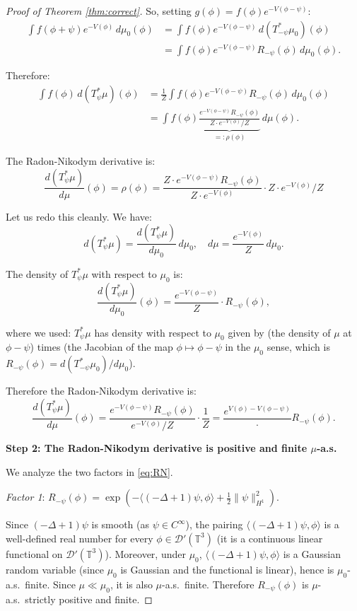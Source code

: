 \documentclass[12pt]{article}
\theoremstyle{definition}
\begin{document}
\begin{proof}[Proof of Theorem \ref{thm:correct}]
So, setting $g(\phi) = f(\phi)e^{-V(\phi-\psi)}$:
\begin{align*}
\int f(\phi+\psi) e^{-V(\phi)}\, d\mu_0(\phi) &= \int f(\phi) e^{-V(\phi-\psi)}\, d(T_{-\psi}^*\mu_0)(\phi) \\
&= \int f(\phi) e^{-V(\phi-\psi)} R_{-\psi}(\phi)\, d\mu_0(\phi).
\end{align*}

Therefore:
\begin{align*}
\int f(\phi)\, d(T_\psi^*\mu)(\phi) &= \frac{1}{Z} \int f(\phi) e^{-V(\phi-\psi)} R_{-\psi}(\phi)\, d\mu_0(\phi) \\
&= \int f(\phi) \underbrace{\frac{e^{-V(\phi-\psi)} R_{-\psi}(\phi)}{Z \cdot e^{-V(\phi)} / Z}}_{=: \rho(\phi)} \, d\mu(\phi).
\end{align*}

The Radon-Nikodym derivative is:
$$\frac{d(T_\psi^*\mu)}{d\mu}(\phi) = \rho(\phi) = \frac{Z \cdot e^{-V(\phi-\psi)} R_{-\psi}(\phi)}{Z \cdot e^{-V(\phi)}} \cdot Z \cdot e^{-V(\phi)} / Z$$

Let us redo this cleanly. We have:
$$d(T_\psi^*\mu) = \frac{d(T_\psi^*\mu)}{d\mu_0}\, d\mu_0, \quad d\mu = \frac{e^{-V(\phi)}}{Z}\, d\mu_0.$$

The density of $T_\psi^*\mu$ with respect to $\mu_0$ is:
$$\frac{d(T_\psi^*\mu)}{d\mu_0}(\phi) = \frac{e^{-V(\phi-\psi)}}{Z} \cdot R_{-\psi}(\phi),$$

where we used: $T_\psi^*\mu$ has density with respect to $\mu_0$ given by (the density of $\mu$ at $\phi - \psi$) times (the Jacobian of the map $\phi \mapsto \phi - \psi$ in the $\mu_0$ sense, which is $R_{-\psi}(\phi) = d(T_{-\psi}^*\mu_0)/d\mu_0$).

Therefore the Radon-Nikodym derivative is:
\begin{equation}\label{eq:RN}
\frac{d(T_\psi^*\mu)}{d\mu}(\phi) = \frac{e^{-V(\phi-\psi)} R_{-\psi}(\phi)}{e^{-V(\phi)}/Z} \cdot \frac{1}{Z} = \frac{e^{V(\phi) - V(\phi-\psi)}} \cdot R_{-\psi}(\phi).
\end{equation}

\textbf{Step 2: The Radon-Nikodym derivative is positive and finite $\mu$-a.s.}

We analyze the two factors in \eqref{eq:RN}.

\textit{Factor 1}: $R_{-\psi}(\phi) = \exp(-\langle(-\Delta+1)\psi, \phi\rangle + \frac{1}{2}\|\psi\|_{H^1}^2)$.

Since $(-\Delta+1)\psi$ is smooth (as $\psi \in C^\infty$), the pairing $\langle(-\Delta+1)\psi, \phi\rangle$ is a well-defined real number for every $\phi \in \mathcal{D}'(\mathbb{T}^3)$ (it is a continuous linear functional on $\mathcal{D}'(\mathbb{T}^3)$). Moreover, under $\mu_0$, $\langle(-\Delta+1)\psi, \phi\rangle$ is a Gaussian random variable (since $\mu_0$ is Gaussian and the functional is linear), hence is $\mu_0$-a.s.\ finite. Since $\mu \ll \mu_0$, it is also $\mu$-a.s.\ finite. Therefore $R_{-\psi}(\phi)$ is $\mu$-a.s.\ strictly positive and finite.


\end{proof}
\end{document}
